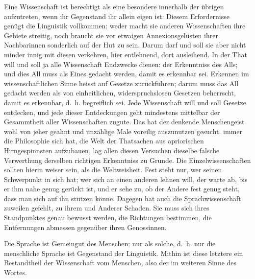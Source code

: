 Eine Wissenschaft ist berechtigt als eine besondere innerhalb der übrigen aufzutreten, wenn ihr Gegenstand ihr allein eigen ist. Diesem Erfordernisse genügt die Linguistik vollkommen: weder macht sie anderen Wissenschaften ihre Gebiete streitig, noch braucht sie vor etwaigen An\-\label{fp.13}nexionsgelüsten ihrer Nachbarinnen sonderlich auf der Hut zu sein. Darum darf und soll sie aber nicht minder innig mit diesen verkehren, hier entlehnend, dort ausleihend. In der That will und soll ja alle Wissenschaft  Endzwecke dienen: der Erkenntniss des Alls; und dies All muss als Eines gedacht werden, damit es erkennbar sei. Erkennen im wissenschaftlichen Sinne heisst auf Gesetze zurückführen; darum muss das All gedacht werden als von einheitlichen, widerspruchslosen Gesetzen beherrscht, damit es erkennbar, d.~h. begreiflich sei. Jede Wissenschaft will und soll Gesetze entdecken, und jede dieser Entdeckungen geht mindestens mittelbar der Gesammtheit aller Wissenschaften zugute. Das hat der denkende Menschengeist wohl von jeher geahnt und unzählige Male voreilig auszunutzen gesucht.   immer die Philosophie sich  hat, die Welt der Thatsachen aus apriorischen Hirngespinnsten aufzubauen, lag allen diesen Versuchen dieselbe falsche Verwerthung derselben richtigen Erkenntniss zu Grunde. Die Einzelwissenschaften sollten hierin weiser sein, als die Weltweisheit. Fest steht nur, wer seinen Schwerpunkt in sich hat; wer sich an einen anderen lehnen will, der warte ab, bis er ihm nahe genug gerückt ist, und er sehe zu, ob der Andere fest genug steht, dass man sich auf ihn stützen könne. Dagegen hat auch die Sprachwissenschaft zuweilen gefehlt, zu ihrem und Anderer Schaden. Sie muss sich ihres Standpunktes genau bewusst werden, die Richtungen bestimmen, die Entfernungen abmessen gegenüber ihren Genossinnen.

Die Sprache ist Gemeingut des Menschen; nur als solche, d.~h. nur die menschliche Sprache ist Gegenstand der Linguistik. Mithin ist diese letztere ein Bestandtheil der Wissenschaft vom Menschen, also der  im weiteren Sinne des Wortes.

\label{sp.14}

